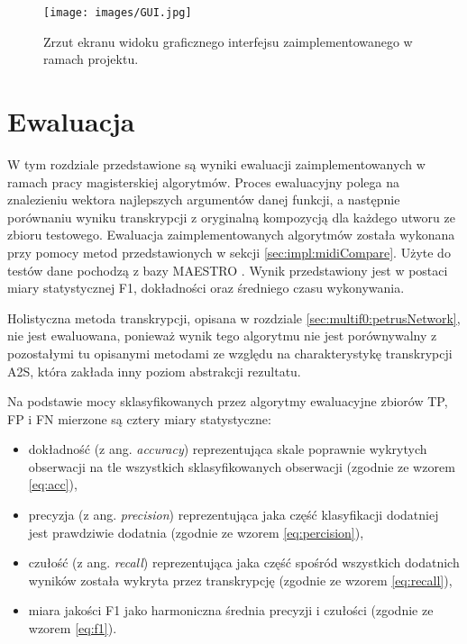 \documentclass[12pt,a4paper,twoside]{mwart}
\begin{document}
\begin{figure}[ht]
  \begin{center}
    \texttt{[image: images/GUI.jpg]}
    \caption{Zrzut ekranu widoku graficznego interfejsu zaimplementowanego w ramach projektu.}
    \label{fig:GUI}
  \end{center}
\end{figure}

\clearpage

\section{Ewaluacja} \label{sec:ewal}
W tym rozdziale przedstawione są wyniki ewaluacji zaimplementowanych w ramach pracy magisterskiej algorytmów. Proces ewaluacyjny polega na znalezieniu wektora najlepszych argumentów danej funkcji, a następnie porównaniu wyniku transkrypcji z oryginalną kompozycją dla każdego utworu ze zbioru testowego. Ewaluacja zaimplementowanych algorytmów została wykonana przy pomocy metod przedstawionych w sekcji \ref{sec:impl:midiCompare}. Użyte do testów dane pochodzą z bazy MAESTRO \cite{Transcription:Curtis:MAESTRO}. Wynik przedstawiony jest w postaci miary statystycznej F1, dokładności oraz średniego czasu wykonywania.

Holistyczna metoda transkrypcji, opisana w rozdziale \ref{sec:multif0:petrusNetwork}, nie jest ewaluowana, ponieważ wynik tego algorytmu nie jest porównywalny z pozostałymi tu opisanymi metodami ze względu na charakterystykę transkrypcji A2S, która zakłada inny poziom abstrakcji rezultatu.

Na podstawie mocy sklasyfikowanych przez algorytmy ewaluacyjne zbiorów TP, FP i FN mierzone są cztery miary statystyczne:
\begin{itemize}
  \item dokładność (z ang. \textit{accuracy}) reprezentująca skale poprawnie wykrytych obserwacji na tle wszystkich sklasyfikowanych obserwacji (zgodnie ze wzorem \ref{eq:acc}),
  \item precyzja (z ang. \textit{precision}) reprezentująca jaka część klasyfikacji dodatniej jest prawdziwie dodatnia (zgodnie ze wzorem \ref{eq:percision}),
  \item czułość (z ang. \textit{recall}) reprezentująca jaka część spośród wszystkich dodatnich wyników została wykryta przez transkrypcję (zgodnie ze wzorem \ref{eq:recall}),
  \item miara jakości F1 jako harmoniczna średnia precyzji i czułości (zgodnie ze wzorem \ref{eq:f1}).
\end{itemize}
\end{document}
